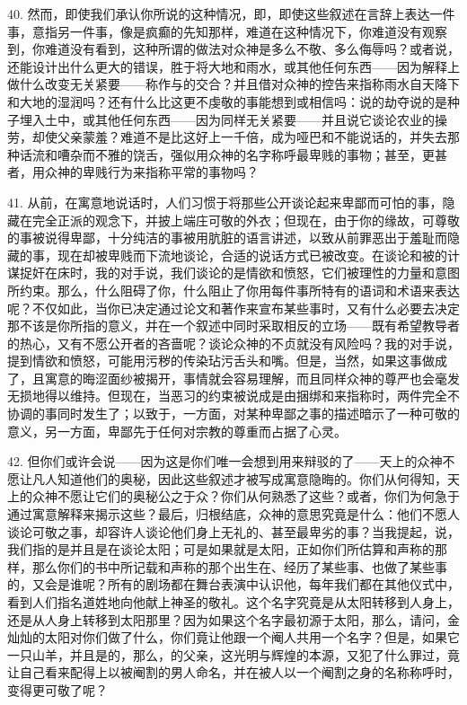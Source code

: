 40. 然而，即使我们承认你所说的这种情况，即，即使这些叙述在言辞上表达一件事，意指另一件事，像是疯癫的先知那样，难道在这种情况下，你难道没有观察到，你难道没有看到，这种所谓的做法对众神是多么不敬、多么侮辱吗？或者说，还能设计出什么更大的错误，胜于将大地和雨水，或其他任何东西——因为解释上做什么改变无关紧要——称作与的交合？并且借对众神的控告来指称雨水自天降下和大地的湿润吗？还有什么比这更不虔敬的事能想到或相信吗：说的劫夺说的是种子埋入土中，或其他任何东西——因为同样无关紧要——并且说它谈论农业的操劳，却使父亲蒙羞？难道不是比这好上一千倍，成为哑巴和不能说话的，并失去那种话流和嘈杂而不雅的饶舌，强似用众神的名字称呼最卑贱的事物；甚至，更甚者，用众神的卑贱行为来指称平常的事物吗？\par

41. 从前，在寓意地说话时，人们习惯于将那些公开谈论起来卑鄙而可怕的事，隐藏在完全正派的观念下，并披上端庄可敬的外衣；但现在，由于你的缘故，可尊敬的事被说得卑鄙，十分纯洁的事被用肮脏的语言讲述，以致从前罪恶出于羞耻而隐藏的事，现在却被卑贱而下流地谈论，合适的说话方式已被改变。在谈论和被的计谋捉奸在床时，我的对手说，我们谈论的是情欲和愤怒，它们被理性的力量和意图所约束。那么，什么阻碍了你，什么阻止了你用每件事所特有的语词和术语来表达呢？不仅如此，当你已决定通过论文和著作来宣布某些事时，又有什么必要去决定那不该是你所指的意义，并在一个叙述中同时采取相反的立场——既有希望教导者的热心，又有不愿公开者的吝啬呢？谈论众神的不贞就没有风险吗？我的对手说，提到情欲和愤怒，可能用污秽的传染玷污舌头和嘴。但是，当然，如果这事做成了，且寓意的晦涩面纱被揭开，事情就会容易理解，而且同样众神的尊严也会毫发无损地得以维持。但现在，当恶习的约束被说成是由捆绑和来指称时，两件完全不协调的事同时发生了；以致于，一方面，对某种卑鄙之事的描述暗示了一种可敬的意义，另一方面，卑鄙先于任何对宗教的尊重而占据了心灵。\par

42. 但你们或许会说——因为这是你们唯一会想到用来辩驳的了——天上的众神不愿让凡人知道他们的奥秘，因此这些叙述才被写成寓意隐晦的。你们从何得知，天上的众神不愿让它们的奥秘公之于众？你们从何熟悉了这些？或者，你们为何急于通过寓意解释来揭示这些？最后，归根结底，众神的意思究竟是什么：他们不愿人谈论可敬之事，却容许人谈论他们身上无礼的、甚至最卑劣的事？当我提起，说，我们指的是并且是在谈论太阳；可是如果就是太阳，正如你们所估算和声称的那样，那么你们的书中所记载和声称的那个出生在、经历了某些事、也做了某些事的，又会是谁呢？所有的剧场都在舞台表演中认识他，每年我们都在其他仪式中，看到人们指名道姓地向他献上神圣的敬礼。这个名字究竟是从太阳转移到人身上，还是从人身上转移到太阳那里？因为如果这个名字最初源于太阳，那么，请问，金灿灿的太阳对你们做了什么，你们竟让他跟一个阉人共用一个名字？但是，如果它一只山羊，并且是的，那么，的父亲，这光明与辉煌的本源，又犯了什么罪过，竟让自己看来配得上以被阉割的男人命名，并在被人以一个阉割之身的名称称呼时，变得更可敬了呢？\par

